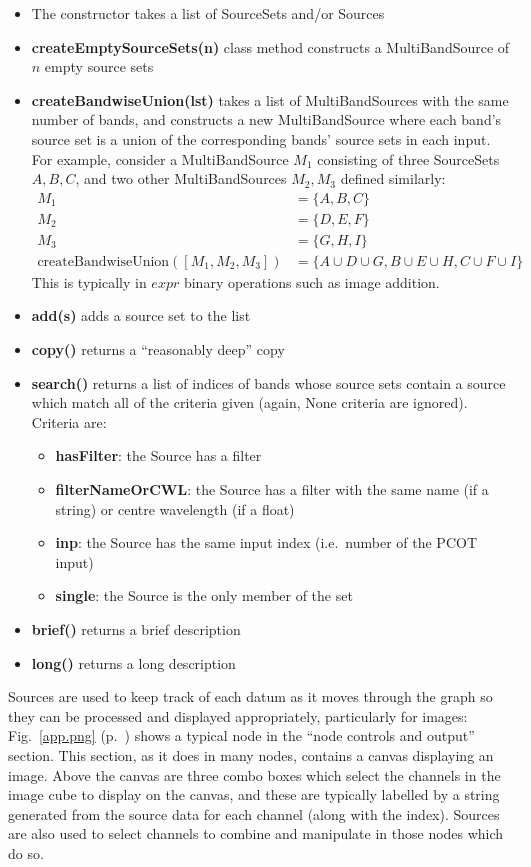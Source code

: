 \begin{itemize}
\item The constructor takes a list of SourceSets and/or Sources
\item \textbf{createEmptySourceSets(n)} class method constructs a MultiBandSource of $n$ empty
source sets
\item \textbf{createBandwiseUnion(lst)} takes a list of MultiBandSources with the same number
of bands, and constructs a new MultiBandSource where each band's source set is a union of
the corresponding bands' source sets in each input. For example, consider a MultiBandSource $M_1$ consisting
of three SourceSets $A, B, C$, and two other MultiBandSources $M_2, M_3$ defined similarly:
\begin{align*}
M_1 &= \{ A, B, C \}\\
M_2 &= \{ D, E, F \}\\
M_3 &= \{ G, H, I \}\\
\text{createBandwiseUnion}([M_1,M_2,M_3]) &= \{ A \cup D \cup G, B \cup E \cup H, C \cup F \cup I\}
\end{align*}
This is typically in $expr$ binary operations such as image addition.
\item \textbf{add(s)} adds a source set to the list
\item \textbf{copy()} returns a ``reasonably deep'' copy
\item \textbf{search()} returns a list of indices of bands whose source sets contain a
source which match all of the criteria given (again, None criteria are ignored). Criteria are:
\begin{itemize}
\item \textbf{hasFilter}: the Source has a filter
\item \textbf{filterNameOrCWL}: the Source has a filter with the same name (if a string)
or centre wavelength (if a float)
\item \textbf{inp}: the Source has the same input index (i.e.\ number of the PCOT input)
\item \textbf{single}: the Source is the only member of the set
\end{itemize}
\item \textbf{brief()} returns a brief description
\item \textbf{long()} returns a long description
\end{itemize}

Sources are used to keep track of each datum as it moves through the graph
so they can be processed and displayed appropriately, particularly for images:
Fig.~\ref{app.png} (p.~\pageref{app.png}) shows
a typical node in the ``node controls and output'' section. This section, as
it does in many nodes, contains a canvas displaying an image. Above the
canvas are three combo boxes which select the channels in the image cube to
display on the canvas, and these are typically labelled by a string generated
from the source data for each channel (along with the index). Sources are also
used to select channels to combine and manipulate in those nodes which do so.

